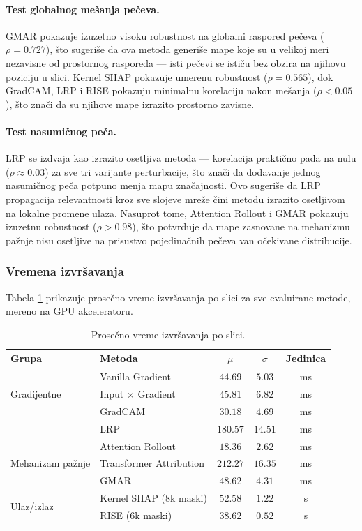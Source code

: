 \paragraph{Test globalnog mešanja pečeva.} GMAR pokazuje izuzetno visoku 
robustnost na globalni raspored pečeva ($\rho = 0.727$), što sugeriše 
da ova metoda generiše mape koje su u velikoj meri nezavisne od prostornog 
rasporeda — isti pečevi se ističu bez obzira na njihovu poziciju u slici. 
Kernel SHAP pokazuje umerenu robustnost ($\rho = 0.565$), dok GradCAM, 
LRP i RISE pokazuju minimalnu korelaciju nakon mešanja ($\rho < 0.05$), 
što znači da su njihove mape izrazito prostorno zavisne.

\paragraph{Test nasumičnog peča.} LRP se izdvaja kao izrazito osetljiva 
metoda — korelacija praktično pada na nulu ($\rho \approx 0.03$) za sve 
tri varijante perturbacije, što znači da dodavanje jednog nasumičnog peča 
potpuno menja mapu značajnosti. Ovo sugeriše da LRP propagacija relevantnosti 
kroz sve slojeve mreže čini metodu izrazito osetljivom na lokalne promene 
ulaza. Nasuprot tome, Attention Rollout i GMAR pokazuju izuzetnu robustnost 
($\rho > 0.98$), što potvrđuje da mape zasnovane na mehanizmu pažnje nisu osetljive na prisustvo pojedinačnih pečeva van očekivane distribucije.

\subsubsection{Vremena izvršavanja}

Tabela \ref{tab:timing} prikazuje prosečno vreme izvršavanja po slici 
za sve evaluirane metode, mereno na GPU akceleratoru.

\begin{table}[h]
\centering
\caption{Prosečno vreme izvršavanja po slici.}
\label{tab:timing}
\begin{tabular}{llccc}
\hline
\textbf{Grupa} & \textbf{Metoda} & \textbf{$\mu$} & \textbf{$\sigma$} & \textbf{Jedinica} \\
\hline
\multirow{3}{*}{Gradijentne} 
    & Vanilla Gradient        & $44.69$ & $5.03$  & ms \\
    & Input $\times$ Gradient & $45.81$ & $6.82$  & ms \\
    & GradCAM                 & $30.18$ & $4.69$  & ms \\
\hline
    & LRP                     & $180.57$ & $14.51$ & ms \\
\hline
\multirow{3}{*}{Mehanizam pažnje}
    & Attention Rollout       & $18.36$  & $2.62$  & ms \\
    & Transformer Attribution & $212.27$ & $16.35$ & ms \\
    & GMAR                    & $48.62$  & $4.31$  & ms \\
\hline
\multirow{2}{*}{Ulaz/izlaz}
    & Kernel SHAP (8k maski)  & $52.58$ & $1.22$ & s \\
    & RISE (6k maski)         & $38.62$ & $0.52$ & s \\
\hline
\end{tabular}
\end{table}

